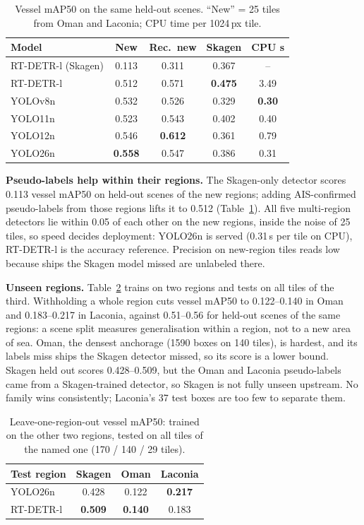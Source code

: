 \documentclass[conference]{IEEEtran}
\begin{document}
\begin{table}[t]
\caption{Vessel mAP50 on the same held-out scenes. ``New'' = 25 tiles from Oman and
Laconia; CPU time per 1024\,px tile.}
\label{tab:detectors}
\centering\footnotesize
\setlength{\tabcolsep}{4pt}
\begin{tabular}{lcccc}
\toprule
Model & New & Rec.\ new & Skagen & CPU s \\
\midrule
RT-DETR-l (Skagen) & 0.113 & 0.311 & 0.367 & -- \\
\midrule
RT-DETR-l & 0.512 & 0.571 & \textbf{0.475} & 3.49 \\
YOLOv8n   & 0.532 & 0.526 & 0.329 & \textbf{0.30} \\
YOLO11n   & 0.523 & 0.543 & 0.402 & 0.40 \\
YOLO12n   & 0.546 & \textbf{0.612} & 0.361 & 0.79 \\
YOLO26n   & \textbf{0.558} & 0.547 & 0.386 & 0.31 \\
\bottomrule
\end{tabular}
\end{table}

\textbf{Pseudo-labels help within their regions.} The Skagen-only detector scores
0.113 vessel mAP50 on held-out scenes of the new regions; adding AIS-confirmed
pseudo-labels from those regions lifts it to 0.512 (Table~\ref{tab:detectors}). All five multi-region detectors lie within 0.05 of
each other on the new regions, inside the noise of 25 tiles, so speed decides
deployment: YOLO26n is served (0.31\,s per tile on CPU), RT-DETR-l is the accuracy
reference. Precision on new-region tiles reads low because ships the Skagen model
missed are unlabeled there. %

\textbf{Unseen regions.} Table~\ref{tab:loro} trains on two regions and tests on all
tiles of the third. Withholding a whole region cuts vessel mAP50 to 0.122--0.140 in Oman
and 0.183--0.217 in Laconia, against 0.51--0.56 for held-out scenes of the same regions:
a scene split measures generalisation within a region, not to a new area of sea. Oman,
the densest anchorage (1590 boxes on 140 tiles), is hardest, and its labels miss ships
the Skagen detector missed, so its score is a lower bound. Skagen held out scores
0.428--0.509, but the Oman and Laconia pseudo-labels came from a Skagen-trained detector,
so Skagen is not fully unseen upstream. No family wins consistently; Laconia's 37 test
boxes are too few to separate them.

\begin{table}[t]
\caption{Leave-one-region-out vessel mAP50: trained on the other two regions, tested
on all tiles of the named one (170 / 140 / 29 tiles).}
\label{tab:loro}
\centering\small
\begin{tabular}{lccc}
\toprule
Test region & Skagen & Oman & Laconia \\
\midrule
YOLO26n   & 0.428 & 0.122 & \textbf{0.217} \\
RT-DETR-l & \textbf{0.509} & \textbf{0.140} & 0.183 \\
\bottomrule
\end{tabular}
\end{table}
\end{document}
